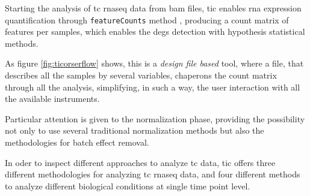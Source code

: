 Starting the analysis of \gls{tc} \gls{rnaseq} data from \gls{bam} files, \gls{tic} enables \gls{rna} expression quantification through \lstinline!featureCounts! method \cite{Liao2014}, producing a count matrix of features per samples, which enables the \glspl{deg} detection with hypothesis statistical methods.

As figure \ref{fig:ticorserflow} shows, this is a \textit{design file based} tool, where a file, that describes all the samples by several variables, chaperons the count matrix through all the analysis, simplifying, in such a way, the user interaction with all the available instruments.
 
Particular attention is given to the normalization phase, providing the possibility not only to use several traditional normalization methods but also the methodologies for batch effect removal.

In oder to inspect different approaches to analyze \gls{tc} data, \gls{tic} offers three different methodologies for analyzing \gls{tc} \gls{rnaseq} data, and four different methods to analyze different biological conditions at single time point level.

